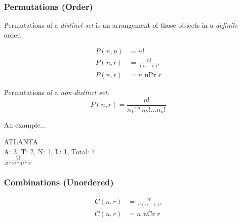 \documentclass[]{article}
\begin{document}
	\subsubsection*{Permutations (Order)}
	Permutations of a \emph{distinct set} is an arrangement of those objects in a \emph{definite} order.
	
	\begin{align*}
		P(n, n) &= n! \\
		P(n, r) &= \frac{n!}{(n - r)!} \\
		P(n, r) &= n \text{ nPr } r
	\end{align*}

	Permutations of a \emph{non-distinct set}.
	\begin{equation*}
		P(n, r) = \frac{n!}{ n_1! * n_2! \dots n_n! }
	\end{equation*}

	An example...
	\begin{center}
		ATLANTA \\
		A: 3, T: 2, N: 1, L: 1, Total: 7 \\
		$ \frac{7!}{3! * 2! * 1! * 1!} $
	\end{center}

	\subsubsection*{Combinations (Unordered)}
	\begin{align*}
		C(n, r) &= \frac{n!}{r!(n-r)!} \\
		C(n, r) &= n \text{ nCr } r
	\end{align*}
\end{document}
